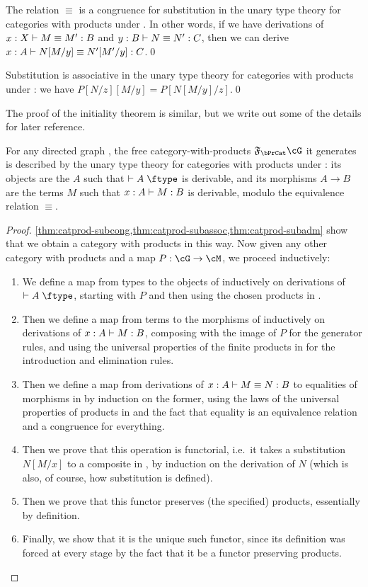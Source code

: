 \begin{lem}\label{thm:catprod-subcong}
  The relation $\equiv$ is a congruence for substitution in the unary type theory for categories with products under \cG.
  In other words, if we have derivations of $x:X \vdash M\equiv M':B$ and $y:B \vdash N\equiv N':C$, then we can derive $x:A \vdash N[M/y] \equiv N'[M'/y]:C$.\qed
\end{lem}

\begin{lem}\label{thm:catprod-subassoc}
  Substitution is associative in the unary type theory for categories with products under \cG: we have $P[N/z][M/y] = P[N[M/y]/z]$.\qed
\end{lem}

The proof of the initiality theorem is similar, but we write out some of the details for later reference.

\begin{thm}\label{thm:catprod-initial}
  For any directed graph \cG, the free category-with-products $\F\bPrCat \cG$ it generates is described by the unary type theory for categories with products under \cG: its objects are the $A$ such that $\types A\type$ is derivable, and its morphisms $A\to B$ are the terms $M$ such that $x:A \vdash M:B$ is derivable, modulo the equivalence relation $\equiv$.
\end{thm}
\begin{proof}
  \cref{thm:catprod-subcong,thm:catprod-subassoc,thm:catprod-subadm} show that we obtain a category with products in this way.
  Now given any other category with products \cM and a map $P:\cG\to\cM$, we proceed inductively:
  \begin{enumerate}
  \item We define a map from types to the objects of \cM inductively on derivations of $\types A\type$, starting with $P$ and then using the chosen products in \cM.
  \item Then we define a map from terms to the morphisms of \cM inductively on derivations of $x:A \vdash M:B$, composing with the image of $P$ for the generator rules, and using the universal properties of the finite products in \cM for the introduction and elimination rules.
  \item Then we define a map from derivations of $x:A \vdash M\equiv N:B$ to equalities of morphisms in \cM by induction on the former, using the laws of the universal properties of products in \cM and the fact that equality is an equivalence relation and a congruence for everything.
  \item Then we prove that this operation is functorial, i.e.\ it takes a substitution $N[M/x]$ to a composite in \cM, by induction on the derivation of $N$ (which is also, of course, how substitution is defined).
  \item Then we prove that this functor preserves (the specified) products, essentially by definition.
  \item Finally, we show that it is the unique such functor, since its definition was forced at every stage by the fact that it be a functor preserving products.\qedhere
  \end{enumerate}
\end{proof}


